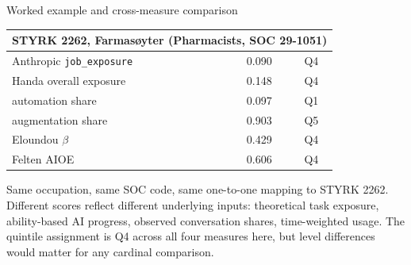 \begin{frame}{Worked example and cross-measure comparison}
\centering\small
\begin{tabular}{lcc}
\toprule
\multicolumn{3}{c}{\textbf{STYRK 2262, Farmasøyter (Pharmacists, SOC 29-1051)}} \\
\midrule
Anthropic \texttt{job\_exposure} & 0.090 & Q4 \\
\addlinespace
Handa overall exposure           & 0.148 & Q4 \\
\quad automation share           & 0.097 & Q1 \\
\quad augmentation share         & 0.903 & Q5 \\
Eloundou $\beta$                  & 0.429 & Q4 \\
Felten AIOE                      & 0.606 & Q4 \\
\bottomrule
\end{tabular}

\vspace{0.8em}
\justifying\small
Same occupation, same SOC code, same one-to-one mapping to STYRK 2262. Different scores reflect different underlying inputs: theoretical task exposure, ability-based AI progress, observed conversation shares, time-weighted usage. The quintile assignment is Q4 across all four measures here, but level differences would matter for any cardinal comparison.
\end{frame}
